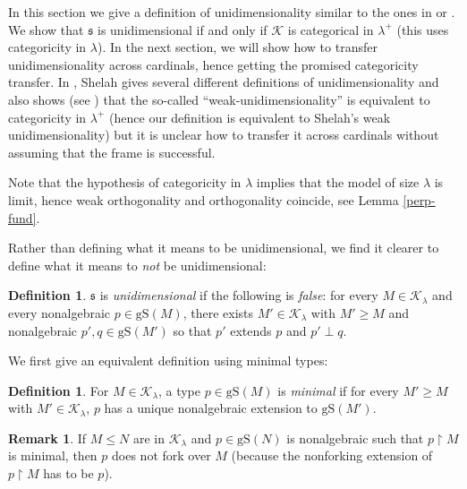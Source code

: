 \documentclass[12pt]{amsart}
\theoremstyle{definition}
\newtheorem{defin}[mydef]{Definition}
\newtheorem{remark}[mydef]{Remark}
\begin{document}
In this section we give a definition of unidimensionality similar to the ones in \cite[Definition V.2.2]{shelahfobook} or \cite[Section III.2]{shelahaecbook}. We show that ${\mathfrak{s}}$ is unidimensional if and only if ${\mathcal{K}}$ is categorical in $\lambda^+$ (this uses categoricity in $\lambda$). In the next section, we will show how to transfer unidimensionality across cardinals, hence getting the promised categoricity transfer. In \cite[Section III.2]{shelahaecbook}, Shelah gives several different definitions of unidimensionality and also shows (see \cite[III.2.3, III.2.9]{shelahaecbook}) that the so-called ``weak-unidimensionality'' is equivalent to categoricity in $\lambda^+$ (hence our definition is equivalent to Shelah's weak unidimensionality) but it is unclear how to transfer it across cardinals without assuming that the frame is successful.

Note that the hypothesis of categoricity in $\lambda$ implies that the model of size $\lambda$ is limit, hence weak orthogonality and orthogonality coincide, see Lemma \ref{perp-fund}.

Rather than defining what it means to be unidimensional, we find it clearer to define what it means to \emph{not} be unidimensional:

\begin{defin}\label{unidim-def}
  ${\mathfrak{s}}$ is \emph{unidimensional} if the following is \emph{false}: for every $M \in {\mathcal{K}}_\lambda$ and every nonalgebraic $p \in {\text{gS}} (M)$, there exists $M' \in {\mathcal{K}}_{\lambda}$ with $M' {\ge} M$ and nonalgebraic $p', q \in {\text{gS}} (M')$ so that $p'$ extends $p$ and $p' \perp q$.
\end{defin}

We first give an equivalent definition using minimal types:

\begin{defin}
  For $M \in {\mathcal{K}}_\lambda$, a type $p \in {\text{gS}} (M)$ is \emph{minimal} if for every $M' {\ge} M$ with $M' \in {\mathcal{K}}_\lambda$, $p$ has a unique nonalgebraic extension to ${\text{gS}} (M')$.
\end{defin}

\begin{remark}\label{min-fork}
  If $M {\le} N$ are in ${\mathcal{K}}_\lambda$ and $p \in {\text{gS}} (N)$ is nonalgebraic such that $p {\upharpoonright} M$ is minimal, then $p$ does not fork over $M$ (because the nonforking extension of $p {\upharpoonright} M$ has to be $p$).
\end{remark}
\end{document}
